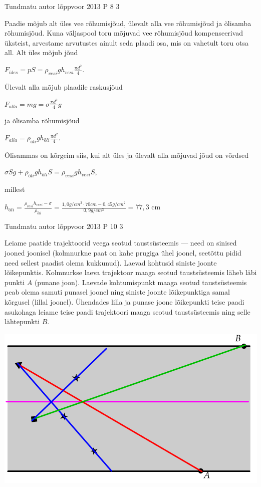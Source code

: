 \documentclass[11pt]{article}
\begin{document}
{%
{Tundmatu autor} %
{lõppvoor} %
{2013} %
{P 8} %
{3} %
{

\ifSolution
Paadie mõjub alt üles vee rõhumisjõud, ülevalt alla vee rõhumisjõud ja õlisamba rõhumisjõud. Kuna väljaspool toru mõjuvad vee rõhumisjõud kompenseerivad üksteist, arvestame arvutustes ainult seda plaadi osa, mis on vahetult toru otsa all.
Alt üles mõjub jõud
\begin{center}
$F_{üles} = pS = \rho_{vesi}gh_{vesi}\frac{\pi d^2}{4}$.
\end{center}
Ülevalt alla mõjub plaadile raskusjõud
\begin{center}
$F_{alla} = mg = \sigma \frac{\pi d^2}{4}g$
\end{center}
ja õlisamba rõhumisjõud
\begin{center}
$F_{alla} = \rho_{õli}gh_{õli}\frac{\pi d^2}{4}$.
\end{center}
Õlisammas on kõrgeim siis, kui alt üles ja ülevalt alla mõjuvad jõud on võrdsed 
\begin{center}
$\sigma Sg + \rho_{õli}gh_{õli}S = \rho_{vesi} gh_{vesi}S$, 
\end{center}
millest
\begin{center}
$h_{õli} = \frac{\rho_{vesi} h_{vesi} - \sigma}{\rho_ {õli}} = \frac{1,0g/cm^3 \cdot 70 cm - 0,45 g/cm^2}{0,9 g/cm^3} = 77,3$ cm
\end{center}
\fi
}

{Tundmatu autor} %
{lõppvoor} %
{2013} %
{P 10} %
{3} %
{

\ifSolution
Leiame paatide trajektoorid veega seotud taustsüsteemis — need on sinised jooned joonisel (kolmnurkne paat on kahe prugiga ühel joonel, seetõttu pidid need sellest paadist olema kukkunud). Laevad kohtusid siniste joonte lõikepunktis. Kolmnurkse laeva trajektoor maaga seotud taustsüsteemis läheb läbi punkti $A$ (punane joon). Laevade kohtumispunkt maaga seotud taustsüsteemis peab olema samuti punasel joonel ning siniste joonte lõikepunktiga samal kõrgusel (lillal joonel). Ühendades lilla ja punase joone lõikepunkti teise paadi asukohaga leiame teise paadi trajektoori maaga seotud taustsüsteemis ning selle lähtepunkti $B$.
\begin{center}
	\includegraphics[width=0.5\linewidth]{2013-v3p-10-lah.PNG}
\end{center}
\fi
}


}
\end{document}
